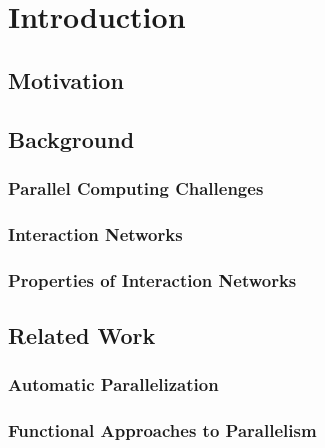 \chapter{Introduction}

\section{Motivation}

\section{Background}

\subsection{Parallel Computing Challenges}

\subsection{Interaction Networks}

\subsection{Properties of Interaction Networks}

\section{Related Work}

\subsection{Automatic Parallelization}

\subsection{Functional Approaches to Parallelism}

